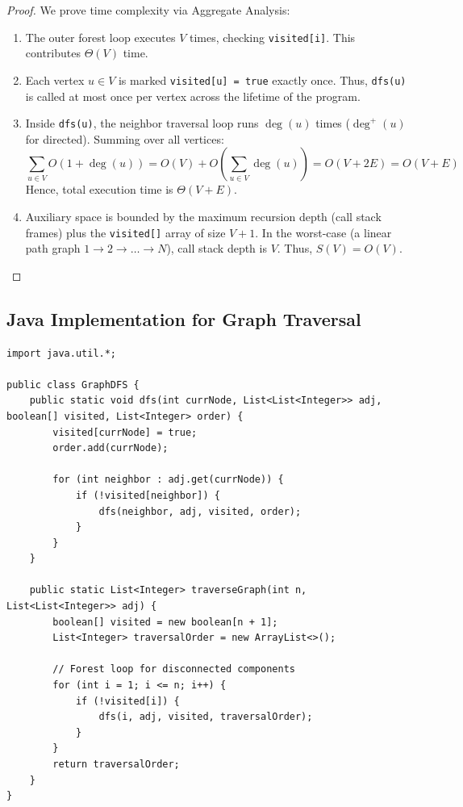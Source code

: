 \documentclass[10pt,journal,compsoc,onecolumn]{IEEEtran}
\begin{document}
\begin{proof}
We prove time complexity via Aggregate Analysis:
\begin{enumerate}
    \item The outer forest loop executes $V$ times, checking \texttt{visited[i]}. This contributes $\Theta(V)$ time.
    \item Each vertex $u \in V$ is marked \texttt{visited[u] = true} exactly once. Thus, \texttt{dfs(u)} is called at most once per vertex across the lifetime of the program.
    \item Inside \texttt{dfs(u)}, the neighbor traversal loop runs $\deg(u)$ times ($\deg^+(u)$ for directed). Summing over all vertices:
    \begin{equation}
    \sum_{u \in V} O(1 + \deg(u)) = O(V) + O\left(\sum_{u \in V} \deg(u)\right) = O(V + 2E) = O(V + E)
    \end{equation}
    Hence, total execution time is $\Theta(V + E)$.
    \item Auxiliary space is bounded by the maximum recursion depth (call stack frames) plus the \texttt{visited[]} array of size $V + 1$. In the worst-case (a linear path graph $1 \to 2 \to \dots \to N$), call stack depth is $V$. Thus, $S(V) = O(V)$.
\end{enumerate}
\end{proof}

\subsection{Java Implementation for Graph Traversal}

\begin{verbatim}
import java.util.*;

public class GraphDFS {
    public static void dfs(int currNode, List<List<Integer>> adj, boolean[] visited, List<Integer> order) {
        visited[currNode] = true;
        order.add(currNode);

        for (int neighbor : adj.get(currNode)) {
            if (!visited[neighbor]) {
                dfs(neighbor, adj, visited, order);
            }
        }
    }

    public static List<Integer> traverseGraph(int n, List<List<Integer>> adj) {
        boolean[] visited = new boolean[n + 1];
        List<Integer> traversalOrder = new ArrayList<>();

        // Forest loop for disconnected components
        for (int i = 1; i <= n; i++) {
            if (!visited[i]) {
                dfs(i, adj, visited, traversalOrder);
            }
        }
        return traversalOrder;
    }
}
\end{verbatim}
\end{document}
